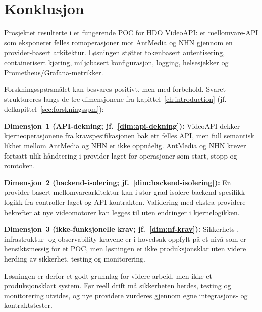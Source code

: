 \section{Konklusjon}
\label{sec:konklusjon}

Prosjektet resulterte i et fungerende POC for HDO VideoAPI:
et mellomvare-API som eksponerer felles romoperasjoner mot AntMedia og
NHN gjennom en provider-basert arkitektur. Løsningen støtter
tokenbasert autentisering, containerisert kjøring, miljøbasert
konfigurasjon, logging, helsesjekker og Prometheus/Grafana-metrikker.

Forskningsspørsmålet kan besvares positivt, men med forbehold. Svaret
struktureres langs de tre dimensjonene fra kapittel~\ref{ch:introduction}
(jf. delkapittel~\ref{sec:forskningsspm}):

\textbf{Dimensjon~1 (API-dekning; jf.~\ref{dim:api-dekning}):}
VideoAPI dekker kjerneoperasjonene fra kravspesifikasjonen bak ett felles
API, men full semantisk likhet mellom AntMedia og NHN er ikke oppnåelig.
AntMedia og NHN krever fortsatt ulik håndtering i provider-laget for
operasjoner som start, stopp og romtoken.

\textbf{Dimensjon~2 (backend-isolering; jf.~\ref{dim:backend-isolering}):}
En provider-basert mellomvarearkitektur kan i stor grad isolere
backend-spesifikk logikk fra controller-laget og API-kontrakten. Validering
med ekstra providere bekrefter at nye videomotorer kan legges til uten
endringer i kjernelogikken.

\textbf{Dimensjon~3 (ikke-funksjonelle krav; jf.~\ref{dim:nf-krav}):}
Sikkerhets-, infrastruktur- og observability-kravene er i hovedsak oppfylt
på et nivå som er hensiktsmessig for et POC, men løsningen er ikke
produksjonsklar uten videre herding av sikkerhet, testing og monitorering.

Løsningen er derfor et godt grunnlag for videre arbeid, men ikke et
produksjonsklart system. Før reell drift må sikkerheten herdes, testing og
monitorering utvides, og nye providere vurderes gjennom egne
integrasjons- og kontraktstester.

